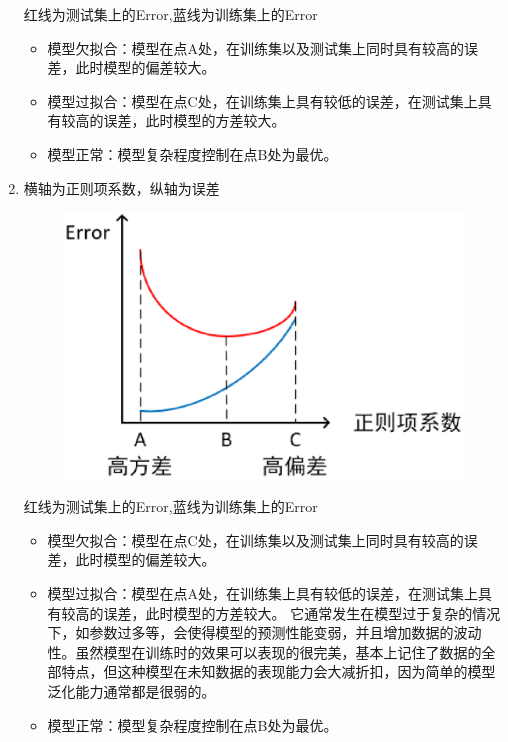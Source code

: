 \begin{enumerate}
		红线为测试集上的Error,蓝线为训练集上的Error

		\begin{itemize}
			\itemsep0em
			\item 模型欠拟合：模型在点A处，在训练集以及测试集上同时具有较高的误差，此时模型的偏差较大。
			\item 模型过拟合：模型在点C处，在训练集上具有较低的误差，在测试集上具有较高的误差，此时模型的方差较大。
			\item 模型正常：模型复杂程度控制在点B处为最优。
		\end{itemize}

	\item 横轴为正则项系数，纵轴为误差

		\begin{figure}[h]
			\centering
			\includegraphics[width=.9\textwidth]{imgs/2.16.4.3.eps}
			\label{fig:2.16.4.1}
		\end{figure}

		红线为测试集上的Error,蓝线为训练集上的Error

		\begin{itemize}
			\itemsep0em
			\item	模型欠拟合：模型在点C处，在训练集以及测试集上同时具有较高的误差，此时模型的偏差较大。
			\item	模型过拟合：模型在点A处，在训练集上具有较低的误差，在测试集上具有较高的误差，此时模型的方差较大。 它通常发生在模型过于复杂的情况下，如参数过多等，会使得模型的预测性能变弱，并且增加数据的波动性。虽然模型在训练时的效果可以表现的很完美，基本上记住了数据的全部特点，但这种模型在未知数据的表现能力会大减折扣，因为简单的模型泛化能力通常都是很弱的。
			\item	模型正常：模型复杂程度控制在点B处为最优。
		\end{itemize}
\end{enumerate}

